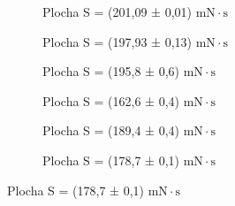 \begin{figure}[H]
        \centering

        \begin{subfigure}[t]{0.3\textwidth}
            \centering
            
            \caption{
                Plocha S = (201,09 ± 0,01) $\mathrm{mN \cdot s}$
            }
            \label{fig:integrales-3a}
        \end{subfigure}%
    \hfill
\begin{subfigure}[t]{0.3\textwidth}
            \centering
            
            \caption{
                Plocha S = (197,93 ± 0,13) $\mathrm{mN \cdot s}$
            }
            \label{fig:integrales-3b}
        \end{subfigure}%
    \hfill
\begin{subfigure}[t]{0.3\textwidth}
            \centering
            
            \caption{
                Plocha S = (195,8 ± 0,6) $\mathrm{mN \cdot s}$
            }
            \label{fig:integrales-3c}
        \end{subfigure}

    \vspace{0.5em}
\begin{subfigure}[t]{0.3\textwidth}
            \centering
            
            \caption{
                Plocha S = (162,6 ± 0,4) $\mathrm{mN \cdot s}$
            }
            \label{fig:integrales-3d}
        \end{subfigure}%
    \hfill
\begin{subfigure}[t]{0.3\textwidth}
            \centering
            
            \caption{
                Plocha S = (189,4 ± 0,4) $\mathrm{mN \cdot s}$
            }
            \label{fig:integrales-3e}
        \end{subfigure}%
    \hfill
\begin{subfigure}[t]{0.3\textwidth}
            \centering
            
            \caption{
                Plocha S = (178,7 ± 0,1) $\mathrm{mN \cdot s}$
            }
            \label{fig:integrales-3f}
        \end{subfigure}


\end{figure}
